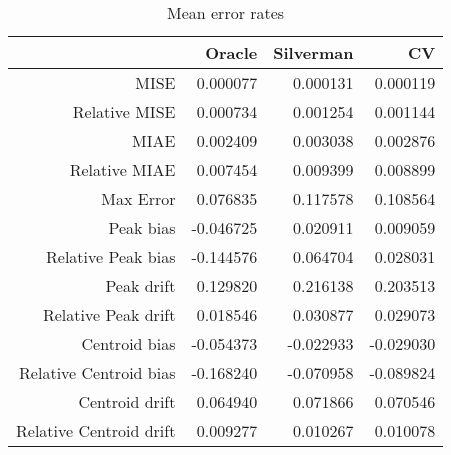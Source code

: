 \begin{table}[ht]
\centering
\begin{tabular}{rrrr}
  \hline
 & Oracle & Silverman & CV \\ 
  \hline
MISE & 0.000077 & 0.000131 & 0.000119 \\ 
  Relative MISE & 0.000734 & 0.001254 & 0.001144 \\ 
  MIAE & 0.002409 & 0.003038 & 0.002876 \\ 
  Relative MIAE & 0.007454 & 0.009399 & 0.008899 \\ 
  Max Error & 0.076835 & 0.117578 & 0.108564 \\ 
  Peak bias & -0.046725 & 0.020911 & 0.009059 \\ 
  Relative Peak bias & -0.144576 & 0.064704 & 0.028031 \\ 
  Peak drift & 0.129820 & 0.216138 & 0.203513 \\ 
  Relative Peak drift & 0.018546 & 0.030877 & 0.029073 \\ 
  Centroid bias & -0.054373 & -0.022933 & -0.029030 \\ 
  Relative Centroid bias & -0.168240 & -0.070958 & -0.089824 \\ 
  Centroid drift & 0.064940 & 0.071866 & 0.070546 \\ 
  Relative Centroid drift & 0.009277 & 0.010267 & 0.010078 \\ 
   \hline
\end{tabular}
\caption{Mean error rates} 
\label{tbl:mean_error_rates}
\end{table}
